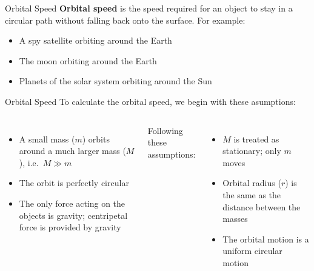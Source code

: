 \documentclass[12pt,compress,aspectratio=169]{beamer}
\begin{document}
\begin{frame}{Orbital Speed}
  \textbf{Orbital speed} is the speed required for an object to stay in a
  circular path without falling back onto the surface. For example:
  \begin{itemize}
  \item A spy satellite orbiting around the Earth
  \item The moon orbiting around the Earth
  \item Planets of the solar system orbiting around the Sun
  \end{itemize}
\end{frame}



\begin{frame}{Orbital Speed}
  To calculate the orbital speed, we begin with these asumptions:
  \begin{columns}
    
    \begin{itemize}
    \item A small mass ($m$) orbits around a much larger mass ($M$), i.e.\
      $M\gg m$
    \item The orbit is perfectly circular
    \item The only force acting on the objects is gravity; centripetal force is
      provided by gravity
    \end{itemize}
    Following these assumptions:
    \begin{itemize}
    \item $M$ is treated as stationary; only $m$ moves
    \item Orbital radius ($r$) is the same as the distance between the masses

    \item The orbital motion is a uniform circular motion
    \end{itemize}
  \end{columns}
\end{frame}
\end{document}
